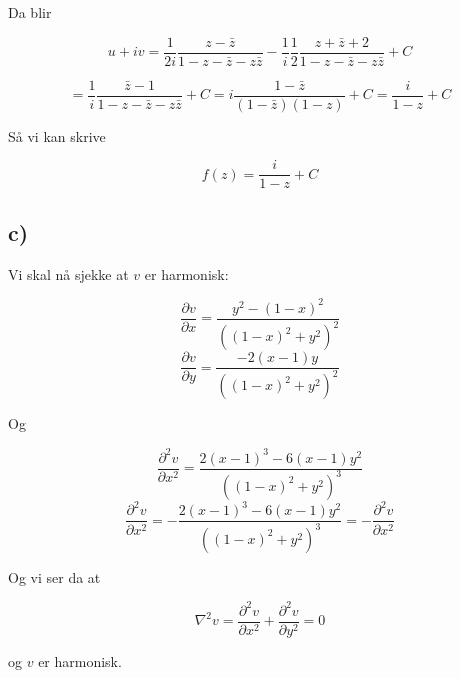 \documentclass[a4paper,norsk, 10pt]{article}
\begin{document}
Da blir 

$$
u + iv = \frac{1}{2i}\frac{z-\bar{z}}{1 - z - \bar{z} - z\bar{z}} - \frac{1}{i}\frac{1}{2}\frac{z+\bar{z} + 2}{1 - z - \bar{z} - z\bar{z}} + C 
$$

$$
= \frac{1}{i}\frac{\bar{z}-1}{1 - z - \bar{z} - z\bar{z}} + C = i \frac{1-\bar{z}}{(1-\bar{z})(1-z)} +C = \frac{i}{1-z} + C
$$

Så vi kan skrive

$$
f(z) = \frac{i}{1-z} + C
$$

\subsection*{c)}
Vi skal nå sjekke at $v$ er harmonisk:

$$
\frac{\partial v}{\partial x} = \frac{y^2 -(1-x)^2}{((1-x)^2 + y^2)^2}
$$
$$
\frac{\partial v}{\partial y} = \frac{-2(x-1)y}{((1-x)^2 + y^2)^2}
$$

Og 

$$
\frac{\partial^2 v}{\partial x^2} = \frac{2(x-1)^3 -6(x-1)y^2}{((1-x)^2 + y^2)^3}
$$
$$
\frac{\partial^2 v}{\partial x^2} = -\frac{2(x-1)^3 -6(x-1)y^2}{((1-x)^2 + y^2)^3} = -\frac{\partial^2 v}{\partial x^2}
$$

Og vi ser da at

$$
\nabla^2 v = \frac{\partial^2 v}{\partial x^2} +\frac{\partial^2 v}{\partial y^2} =  0
$$

og $v$ er harmonisk.

 

\end{document}
